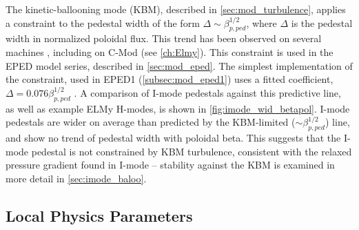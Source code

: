 The kinetic-ballooning mode (KBM), described in \cref{sec:mod_turbulence}, applies a constraint to the pedestal width of the form $\Delta \sim \beta_{p,ped}^{1/2}$, where $\Delta$ is the pedestal width in normalized poloidal flux.  This trend has been observed on several machines \cite{Groebner2013,Beurskens2011,Osborne1998}, including on C-Mod (see \cref{ch:Elmy}).  This constraint is used in the EPED model series, described in \cref{sec:mod_eped}.  The simplest implementation of the constraint, used in EPED1 (\cref{subsec:mod_eped1}) uses a fitted coefficient, $\Delta = 0.076 \beta_{p,ped}^{1/2}$ \cite{Snyder2009}.  A comparison of I-mode pedestals against this predictive line, as well as example ELMy H-modes, is shown in \cref{fig:imode_wid_betapol}.  I-mode pedestals are wider on average than predicted by the KBM-limited ($\sim \beta_{p,ped}^{1/2}$) line, and show no trend of pedestal width with poloidal beta.  This suggests that the I-mode pedestal is not constrained by KBM turbulence, consistent with the relaxed pressure gradient found in I-mode -- stability against the KBM is examined in more detail in \cref{sec:imode_baloo}.

\subsection{Local Physics Parameters}\label{subsec:imode_exp_widths}

\begin{figure}[p]
 \pushtooutside
\end{figure}

